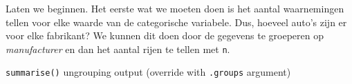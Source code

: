 \documentclass[]{tufte-book}
\newenvironment{Shaded}{}{}
\newcommand{\DataTypeTok}[1]{\textcolor[rgb]{0.56,0.13,0.00}{#1}}
\newcommand{\KeywordTok}[1]{\textcolor[rgb]{0.00,0.44,0.13}{\textbf{#1}}}
\newcommand{\NormalTok}[1]{#1}
\newcommand{\OperatorTok}[1]{\textcolor[rgb]{0.40,0.40,0.40}{#1}}
\newcommand{\StringTok}[1]{\textcolor[rgb]{0.25,0.44,0.63}{#1}}
\begin{document}
Laten we beginnen. Het eerste wat we moeten doen is het aantal waarnemingen tellen voor elke waarde van de categorische variabele. Dus, hoeveel auto's zijn er voor elke fabrikant? We kunnen dit doen door de gegevens te groeperen op \emph{manufacturer} en dan het aantal rijen te tellen met \texttt{n}.

\begin{Shaded}
\end{Shaded}

\texttt{summarise()} ungrouping output (override with \texttt{.groups} argument)
\end{document}
